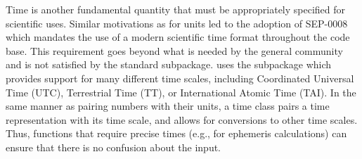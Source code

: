 Time is another fundamental quantity that must be appropriately specified for scientific uses.
Similar motivations as for units led to the adoption of SEP-0008 \citep{sep-0008} which mandates the use of a modern scientific time format throughout the \sunpypkg code base.
This requirement goes beyond what is needed by the general \python community and is not satisfied by the standard  subpackage.
\sunpypkg uses the  subpackage which provides support for many different time scales, including Coordinated Universal Time (UTC), Terrestrial Time (TT), or International Atomic Time (TAI).
In the same manner as pairing numbers with their units, a time class pairs a time representation with its time scale, and allows for conversions to other time scales.
Thus, functions that require precise times (e.g., for ephemeris calculations) can ensure that there is no confusion about the input.
